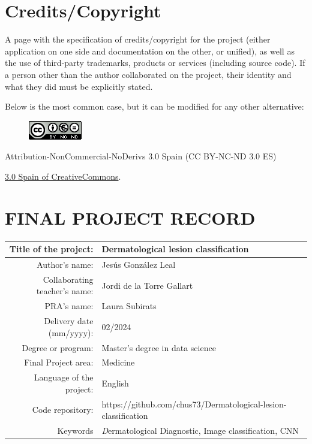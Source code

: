 \setcounter{page}{1}
\pagestyle{plain}

\chapter*{Credits/Copyright}

A page with the specification of credits/copyright for the project (either application on one side and documentation on the other, or unified), as well as the use of third-party trademarks, products or services (including source code). If a person other than the author collaborated on the project, their identity and what they did must be explicitly stated.

Below is the most common case, but it can be modified for any other alternative:

\vspace{1cm}

\begin{figure}[ht]
\centering
\includegraphics[scale=1]{images/license.png}
\end{figure}

Attribution-NonCommercial-NoDerivs 3.0 Spain (CC BY-NC-ND 3.0 ES) 

\href{https://creativecommons.org/licenses/by-nc-nd/3.0/es/}{3.0 Spain of CreativeCommons}.

\chapter*{FINAL PROJECT RECORD}

\begin{table}[ht]
\centering{}
\renewcommand{\arraystretch}{2}
\begin{tabular}{r | l}
\hline
Title of the project: & Dermatological lesion classification\\
\hline
Author's name: & Jesús González Leal\\
\hline
Collaborating teacher's name: & Jordi de la Torre Gallart\\
\hline
PRA's name: & Laura Subirats\\
\hline
Delivery date (mm/yyyy): & 02/2024\\
\hline
Degree or program: & Master’s degree in data science\\
\hline
Final Project area: & Medicine\\
\hline
Language of the project: & English\\
\hline
Code repository: & https://github.com/chus73/Dermatological-lesion-classification\\

\hline
Keywords & \textit Dermatological Diagnostic, Image classification, CNN  \\
\hline
\end{tabular}
\end{table}


